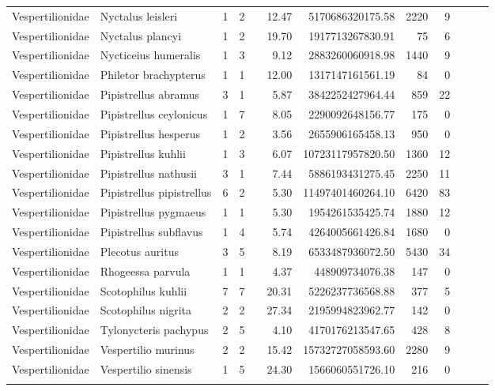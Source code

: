 \begin{landscape}
\begin{longtable}{@{}llrrrrrrrrrr@{}}
  Vespertilionidae & Nyctalus leisleri &   1 &   2 &  & 12.47 & 5170686320175.58 & 2220 &   9 &  &  &  \\ 
  Vespertilionidae & Nyctalus plancyi &   1 &   2 &  & 19.70 & 1917713267830.91 &  75 &   6 &  &  &  \\ 
  Vespertilionidae & Nycticeius humeralis &   1 &   3 &  & 9.12 & 2883260060918.98 & 1440 &   9 &  &  &  \\ 
  Vespertilionidae & Philetor brachypterus &   1 &   1 &  & 12.00 & 1317147161561.19 &  84 &   0 &  &  &  \\ 
  Vespertilionidae & Pipistrellus abramus &   3 &   1 &  & 5.87 & 3842252427964.44 & 859 &  22 &  &  &  \\ 
  Vespertilionidae & Pipistrellus ceylonicus &   1 &   7 &  & 8.05 & 2290092648156.77 & 175 &   0 &  &  &  \\ 
  Vespertilionidae & Pipistrellus hesperus &   1 &   2 &  & 3.56 & 2655906165458.13 & 950 &   0 &  &  &  \\ 
  Vespertilionidae & Pipistrellus kuhlii &   1 &   3 &  & 6.07 & 10723117957820.50 & 1360 &  12 &  &  &  \\ 
  Vespertilionidae & Pipistrellus nathusii &   3 &   1 &  & 7.44 & 5886193431275.45 & 2250 &  11 &  &  &  \\ 
  Vespertilionidae & Pipistrellus pipistrellus &   6 &   2 &  & 5.30 & 11497401460264.10 & 6420 &  83 &  &  &  \\ 
  Vespertilionidae & Pipistrellus pygmaeus &   1 &   1 &  & 5.30 & 1954261535425.74 & 1880 &  12 &  &  &  \\ 
  Vespertilionidae & Pipistrellus subflavus &   1 &   4 &  & 5.74 & 4264005661426.84 & 1680 &   0 &  &  &  \\ 
  Vespertilionidae & Plecotus auritus &   3 &   5 &  & 8.19 & 6533487936072.50 & 5430 &  34 &  &  &  \\ 
  Vespertilionidae & Rhogeessa parvula &   1 &   1 &  & 4.37 & 448909734076.38 & 147 &   0 &  &  &  \\ 
  Vespertilionidae & Scotophilus kuhlii &   7 &   7 &  & 20.31 & 5226237736568.88 & 377 &   5 &  &  &  \\ 
  Vespertilionidae & Scotophilus nigrita &   2 &   2 &  & 27.34 & 2195994823962.77 & 142 &   0 &  &  &  \\ 
  Vespertilionidae & Tylonycteris pachypus &   2 &   5 &  & 4.10 & 4170176213547.65 & 428 &   8 &  &  &  \\ 
  Vespertilionidae & Vespertilio murinus &   2 &   2 &  & 15.42 & 15732727058593.60 & 2280 &   9 &  &  &  \\ 
  Vespertilionidae & Vespertilio sinensis &   1 &   5 &  & 24.30 & 1566060551726.10 & 216 &   0 &  &  &  \\ 
   \bottomrule
\label{A-rawData}
\end{longtable}
\endgroup

\end{landscape}

